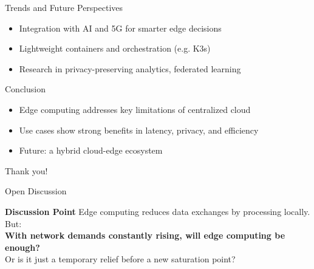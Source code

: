 \documentclass{beamer}
\begin{document}
\begin{frame}{Trends and Future Perspectives}
  \begin{itemize}
    \item Integration with AI and 5G for smarter edge decisions
    \item Lightweight containers and orchestration (e.g. K3s)
    \item Research in privacy-preserving analytics, federated learning
  \end{itemize}
\end{frame}

\begin{frame}{Conclusion}
    \begin{itemize}
      \item Edge computing addresses key limitations of centralized cloud
      \item Use cases show strong benefits in latency, privacy, and efficiency
      \item Future: a hybrid cloud-edge ecosystem
    \end{itemize}
    \vspace{0.3cm}
    Thank you!\\
  \end{frame}

\begin{frame}{Open Discussion}
  \begin{block}{\textbf{Discussion Point}}
    Edge computing reduces data exchanges by processing locally. But:\\
    \textbf{With network demands constantly rising, will edge computing be enough?}\\
    Or is it just a temporary relief before a new saturation point?
  \end{block}
\end{frame}
\end{document}
